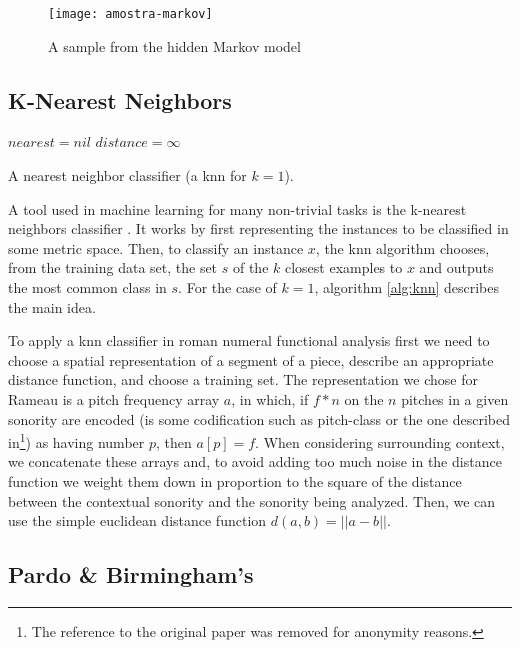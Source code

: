 \begin{figure*}[t]
  \centering
  \texttt{[image: amostra-markov]}
  \caption{A sample from the hidden Markov model}
  \label{fig:amostra}
\end{figure*}

\subsection{K-Nearest Neighbors}
\label{sec:knn}

\begin{algorithm}[t]
  \SetLine
  $nearest = nil$\;
  $distance = \infty$\;
  \;
  \caption{A nearest neighbor classifier (a knn for $k=1$).}
  \label{alg:knn}
\end{algorithm}

A tool used in machine learning for many non-trivial tasks is the
k-nearest neighbors classifier \cite{mitchell97:machine}. It works by
first representing the instances to be classified in some metric
space. Then, to classify an instance $x$, the knn algorithm chooses,
from the training data set, the set $s$ of the $k$ closest examples to
$x$ and outputs the most common class in $s$. For the case of $k=1$,
algorithm \ref{alg:knn} describes the main idea.

To apply a knn classifier in roman numeral functional analysis first
we need to choose a spatial representation of a segment of a piece,
describe an appropriate distance function, and choose a training
set. The representation we chose for Rameau is a pitch frequency array
$a$, in which, if $f*n$ on the $n$ pitches in a given sonority are
encoded (is some codification such as pitch-class or the one described
in\footnote{The reference to the original paper was removed for
  anonymity reasons.}) as having number $p$, then $a[p] = f$. When
considering surrounding context, we concatenate these arrays and, to
avoid adding too much noise in the distance function we weight them
down in proportion to the square of the distance between the
contextual sonority and the sonority being analyzed. Then, we can use
the simple euclidean distance function $d(a,b) = ||a-b||$.

\subsection{Pardo \& Birmingham's}
\label{sec:pardo--birminghams}

